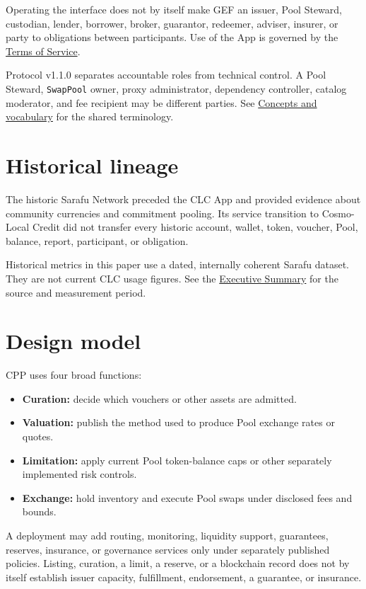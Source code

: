 \documentclass[11pt]{article}
\begin{document}
Operating the interface does not by itself make GEF an issuer, Pool Steward, custodian, lender, borrower, broker, guarantor, redeemer, adviser, insurer, or party to obligations between participants. Use of the App is governed by the \href{https://docs.cosmolocal.credit/governance/terms}{Terms of Service}.

Protocol v1.1.0 separates accountable roles from technical control. A Pool Steward, \texttt{SwapPool} owner, proxy administrator, dependency controller, catalog moderator, and fee recipient may be different parties. See \href{https://docs.cosmolocal.credit/introduction/concepts}{Concepts and vocabulary} for the shared terminology.

\section*{Historical lineage}

The historic Sarafu Network preceded the CLC App and provided evidence about community currencies and commitment pooling. Its service transition to Cosmo-Local Credit did not transfer every historic account, wallet, token, voucher, Pool, balance, report, participant, or obligation.

Historical metrics in this paper use a dated, internally coherent Sarafu dataset. They are not current CLC usage figures. See the \href{https://docs.cosmolocal.credit/white-paper/executive-summary}{Executive Summary} for the source and measurement period.

\section*{Design model}

CPP uses four broad functions:

\begin{itemize}[leftmargin=*]
\item \textbf{Curation:} decide which vouchers or other assets are admitted.
\item \textbf{Valuation:} publish the method used to produce Pool exchange rates or quotes.
\item \textbf{Limitation:} apply current Pool token-balance caps or other separately implemented risk controls.
\item \textbf{Exchange:} hold inventory and execute Pool swaps under disclosed fees and bounds.
\end{itemize}
A deployment may add routing, monitoring, liquidity support, guarantees, reserves, insurance, or governance services only under separately published policies. Listing, curation, a limit, a reserve, or a blockchain record does not by itself establish issuer capacity, fulfillment, endorsement, a guarantee, or insurance.
\end{document}
